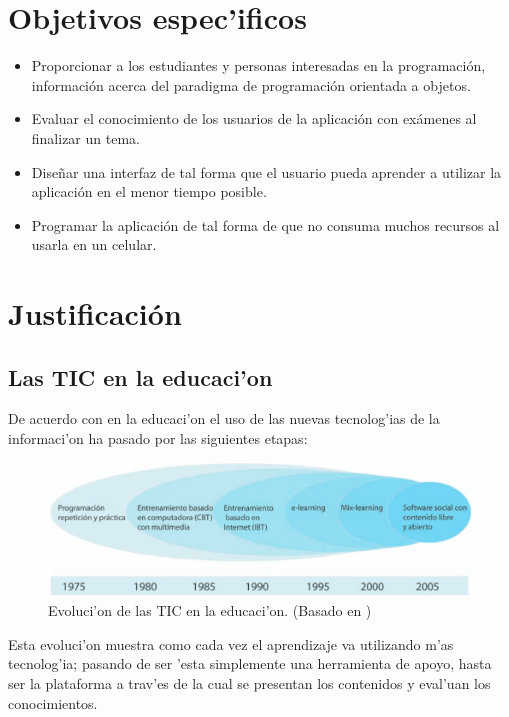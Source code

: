 \section{Objetivos espec'ificos} 
\begin{itemize}
\item Proporcionar a los estudiantes y personas interesadas en la programación, información acerca del paradigma de programación orientada a objetos.
\item Evaluar el conocimiento de los usuarios de la aplicación con exámenes al finalizar un tema.
\item Diseñar una interfaz de tal forma que el usuario pueda aprender a utilizar la aplicación en el menor tiempo posible.
\item Programar la aplicación de tal forma de que no consuma muchos recursos al usarla en un celular.
\end{itemize}

\section{Justificación}
\subsection{Las TIC en la educaci'on}
De acuerdo con \cite{palaciostics} en la educaci'on el uso de las nuevas tecnolog'ias de la informaci'on ha pasado por las siguientes etapas:

\begin{figure}
	\begin{center}
		\includegraphics[scale=0.5]{img/img1.png} 
		\caption{Evoluci'on de las TIC en la educaci'on. (Basado en \cite{palaciostics})}
		\label{tic}
	\end{center}
\end{figure}

Esta evoluci'on muestra como cada vez el aprendizaje va utilizando m'as tecnolog'ia; pasando de ser 'esta simplemente una herramienta de apoyo, hasta ser la plataforma a trav'es de la cual se presentan los contenidos y eval'uan los conocimientos. 

